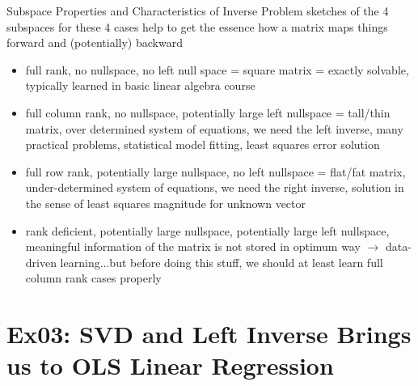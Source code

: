 \documentclass[mathserif, aspectratio=1610]{intbeamer}
\begin{document}
\begin{frame}{Subspace Properties and Characteristics of Inverse Problem}
%
sketches of the 4 subspaces for these 4 cases help to get the essence how a matrix maps things forward and (potentially) backward
%
\begin{itemize}
\item full rank, no nullspace, no left null space = square matrix = exactly solvable, typically learned in basic linear algebra course
\item full column rank, no nullspace, potentially large left nullspace = tall/thin matrix, over determined system of equations, we need the left inverse, many practical problems, statistical model fitting, least squares error solution
\item full row rank, potentially large nullspace, no left nullspace = flat/fat matrix, under-determined system of equations, we need the right inverse, solution in the sense of least squares magnitude for unknown vector
\item rank deficient, potentially large nullspace, potentially large left nullspace, meaningful information of the matrix is not stored in optimum way $\rightarrow$ data-driven learning...but before doing this stuff, we should at least learn full column rank cases properly
\end{itemize}
%
\end{frame}



































\section{Ex03: SVD and Left Inverse Brings us to OLS Linear Regression}
\end{document}
